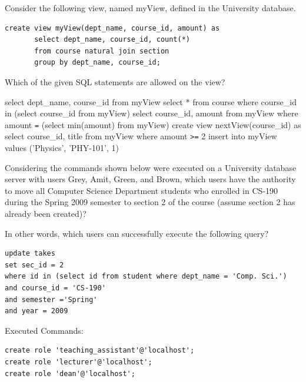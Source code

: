 \documentclass[12pt, addpoints, answers]{exam}
\begin{document}
\begin{questions}
\begin{minipage}{\linewidth}
\question[5]
Consider the following view, named myView, defined in the University database.\par\vspace{0.5em}
\begin{verbatim}
create view myView(dept_name, course_id, amount) as
       select dept_name, course_id, count(*)
       from course natural join section
       group by dept_name, course_id;
\end{verbatim}
Which of the given SQL statements are allowed on the view?\par\vspace{0.5em}
\begin{checkboxes}
    \CorrectChoice select dept\_name, course\_id from myView
    \CorrectChoice select * from course where course\_id in (select course\_id from myView)
    \CorrectChoice select course\_id, amount from myView where amount \texttt{=} (select min(amount) from myView)
    \choice create view nextView(course\_id) as select course\_id, title from myView where amount \texttt{>=} 2
    \choice insert into myView values ('Physics', 'PHY-101', 1)
\end{checkboxes}
\end{minipage}\vspace{1em}

\begin{samepage}
\question[4]
Considering the commands shown below were executed on a University database server with users Grey, Amit, Green, and Brown,
which users have the authority to move all Computer Science Department students who enrolled in CS-190 during the Spring 2009 
semester to section 2 of the course (assume section 2 has already been created)?\par\vspace{0.5em}
In other words, which users can successfully execute the following query?\par\vspace{0.5em}
\begin{verbatim}
update takes
set sec_id = 2
where id in (select id from student where dept_name = 'Comp. Sci.')
and course_id = 'CS-190'
and semester ='Spring'
and year = 2009
\end{verbatim}
Executed Commands:\par\vspace{0.5em}
\begin{verbatim}
create role 'teaching_assistant'@'localhost';
create role 'lecturer'@'localhost';
create role 'dean'@'localhost';


\end{verbatim}
\end{samepage}
\end{questions}
\end{document}
